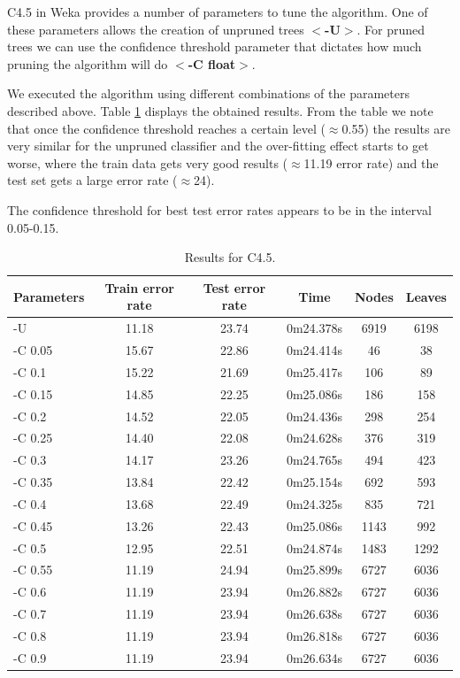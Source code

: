 \documentclass[a4paper]{llncs}
\begin{document}
C4.5 in Weka provides a number of parameters to tune the algorithm.
One of these parameters allows the creation of unpruned trees $<$\textbf{-U}$>$.
For pruned trees we can use the confidence threshold parameter that dictates how
much pruning the algorithm will do $<$\textbf{-C float}$>$.

We executed the algorithm using different combinations of the parameters described above.
Table \ref{tbl:results_c45} displays the obtained results. From the table
we note that once the confidence threshold reaches a certain level ($\approx$0.55) the results
are very similar for the unpruned classifier and the over-fitting effect starts to get worse,
where the train data gets very good results ($\approx$11.19 error rate) and the test set gets a
large error rate ($\approx$24).

The confidence threshold for best test error rates appears to be in the interval 0.05-0.15.   

\begin{table}[ht]
  \begin{center}
  \begin{tabular}{ | l | c | c | c | c | c |}
    \hline
    \textbf{Parameters} & \textbf{Train error rate} & \textbf{Test error rate} & \textbf{Time} & \textbf{Nodes} & \textbf{Leaves} \\ \hline
    -U & 11.18 & 23.74 & 0m24.378s & 6919 & 6198 \\ \hline
    -C 0.05 & 15.67 & 22.86 & 0m24.414s & 46 & 38 \\ \hline
    -C 0.1 & 15.22 & 21.69 & 0m25.417s & 106 & 89 \\ \hline
    -C 0.15 & 14.85 & 22.25 & 0m25.086s & 186 & 158 \\ \hline
    -C 0.2 & 14.52 & 22.05 & 0m24.436s & 298 & 254 \\ \hline
    -C 0.25 & 14.40 & 22.08 & 0m24.628s & 376 & 319 \\ \hline
    -C 0.3 & 14.17 & 23.26 & 0m24.765s & 494 & 423 \\ \hline
    -C 0.35 & 13.84 & 22.42 & 0m25.154s & 692 & 593 \\ \hline
    -C 0.4 & 13.68 & 22.49 & 0m24.325s & 835 & 721 \\ \hline
    -C 0.45 & 13.26 & 22.43 & 0m25.086s & 1143 & 992 \\ \hline
    -C 0.5 & 12.95 & 22.51 & 0m24.874s & 1483 & 1292 \\ \hline
    -C 0.55 & 11.19 & 24.94 & 0m25.899s & 6727 & 6036 \\ \hline
    -C 0.6 & 11.19 & 23.94 & 0m26.882s & 6727 & 6036 \\ \hline
    -C 0.7 & 11.19 & 23.94 & 0m26.638s & 6727 & 6036 \\ \hline
    -C 0.8 & 11.19 & 23.94 & 0m26.818s & 6727 & 6036 \\ \hline
    -C 0.9 & 11.19 & 23.94 & 0m26.634s & 6727 & 6036 \\ \hline
  \end{tabular}
  \caption{Results for C4.5.}
  \label{tbl:results_c45}
  \end{center}
\end{table}
\end{document}
